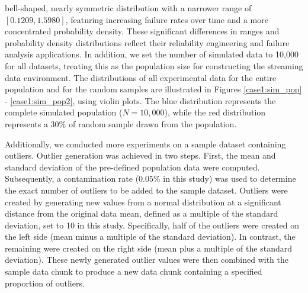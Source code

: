 \documentclass[a4paper,fleqn]{cas-dc}
\begin{document}
bell-shaped, nearly symmetric distribution with a narrower range of $[0.1209, 1.5980]$, 
featuring increasing failure rates over time and a more concentrated probability density. These significant differences in ranges and probability density 
distributions reflect their reliability engineering and failure analysis applications. In addition, 
we set the number of simulated data to 10,000 for all datasets, 
treating this as the population size for constructing the streaming data environment. The distributions of all experimental data for the entire population and for the random samples are 
illustrated in Figures \ref{case1:sim_pop}  - \ref{case1:sim_pop2}, using violin plots. The blue distribution represents the complete simulated population ($N=10,000$), while the red distribution represents a $30\%$ of random sample drawn from the population.

Additionally, we conducted more experiments on a sample dataset containing outliers. Outlier generation was achieved in two steps. First, the mean and standard deviation of the pre-defined population data were computed. Subsequently, a contamination rate ($0.05\%$ in this study) was used to determine the exact number of outliers to be added to the sample dataset.
Outliers were created by generating new values from a normal distribution at 
a significant distance from the original data mean, defined as a multiple of the standard deviation, set to 10 in this study. Specifically, half of the outliers were created on 
the left side (mean minus a multiple of the standard deviation). In contrast, the remaining were created on the 
right side (mean plus a multiple of the standard deviation). These newly generated outlier values were 
then combined with the sample data chunk to produce a new data chunk containing a specified proportion 
of outliers.
\end{document}
